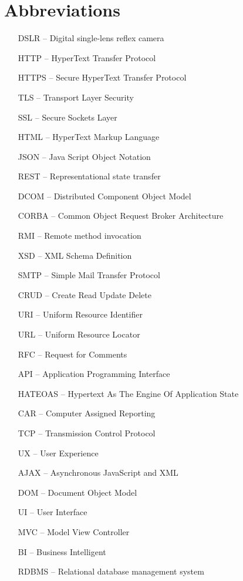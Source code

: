 \section*{Abbreviations}

\begin{itemize}[leftmargin=2cm, topsep=0pt, partopsep=5pt,itemsep=0pt,parsep=0pt]
\item[DSLR --] Digital single-lens reflex camera
\item[HTTP --] HyperText Transfer Protocol
\item[HTTPS --] Secure HyperText Transfer Protocol
\item[TLS --] Transport Layer Security
\item[SSL --] Secure Sockets Layer
\item[HTML --] HyperText Markup Language
\item[JSON --] Java Script Object Notation
\item[REST --] Representational state transfer
\item[DCOM --] Distributed Component Object Model
\item[CORBA --] Common Object Request Broker Architecture
\item[RMI --] Remote method invocation
\item[XSD --] XML Schema Definition
\item[SMTP --] Simple Mail Transfer Protocol
\item[CRUD --] Create Read Update Delete
\item[URI --] Uniform Resource Identifier
\item[URL --] Uniform Resource Locator
\item[RFC --] Request for Comments
\item[API --] Application Programming Interface
\item[HATEOAS --] Hypertext As The Engine Of Application State
\item[CAR --] Computer Assigned Reporting
\item[TCP --] Transmission Control Protocol
\item[UX --] User Experience
\item[AJAX --] Asynchronous JavaScript and XML
\item[DOM --] Document Object Model
\item[UI --] User Interface
\item[MVC --] Model View Controller
\item[BI --] Business Intelligent
\item[RDBMS --] Relational database management system

\end{itemize}

